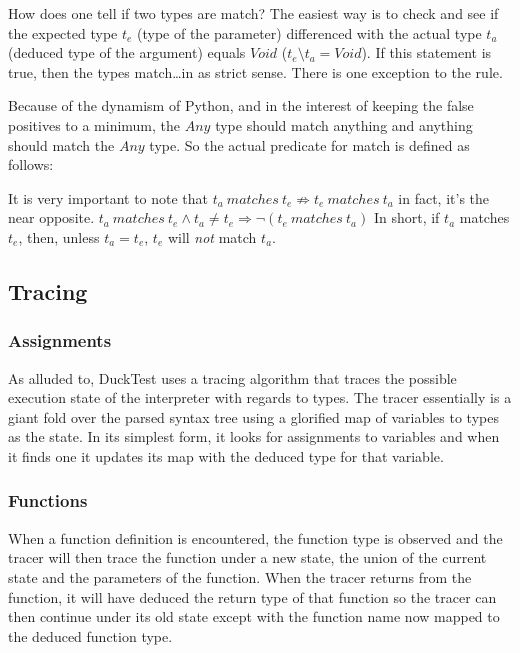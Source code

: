 \documentclass{scrartcl}
\begin{document}
\begin{multicols}{2}
How does one tell if two types are match? The easiest way is to check
and see if the expected type $t_e$ (type of the parameter) differenced
with the actual type $t_a$ (deduced type of the argument) equals $Void$
($t_e\setminus t_a = Void$). If this statement is true, then the types
match\ldots in as strict sense. There is one exception to the rule.

Because of the dynamism of Python, and in the interest of keeping
the false positives to a minimum, the $Any$ type should match anything
and anything should match the $Any$ type. So the actual predicate for
match is defined as follows:


It is very important to note that $t_a\ matches\ t_e \not\Rightarrow t_e\ matches\ t_a$
in fact, it's the near opposite. $t_a\ matches\ t_e \land t_a\not=t_e \Rightarrow \lnot(t_e\ matches\ t_a)$
In short, if $t_a$ matches $t_e$, then, unless $t_a = t_e$, $t_e$ will \emph{not} match $t_a$.

\subsection*{Tracing}

\subsubsection*{Assignments}
As alluded to, DuckTest uses a tracing algorithm that traces the possible
execution state of the interpreter with regards to types. The tracer essentially
is a giant fold over the parsed syntax tree using a glorified map of variables
to types as the state. In its simplest form, it looks for assignments
to variables and when it finds one it updates its map with the deduced
type for that variable.


\subsubsection*{Functions}
When a function definition is encountered, the function type is observed
and the tracer will then trace the function under a new state, the union
of the current state and the parameters of the function. When the tracer
returns from the function, it will have deduced the return type of that function
so the tracer can then continue under its old state except with the function name
now mapped to the deduced function type.


\end{multicols}
\end{document}
